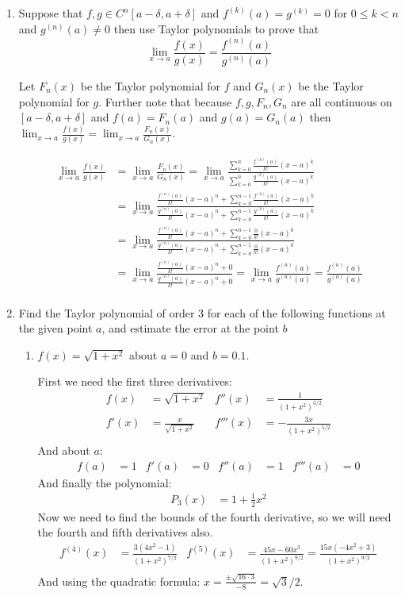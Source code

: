 \documentclass[letterpaper]{article}
\begin{document}
\begin{enumerate}
  \item
  Suppose that $f,g\in C^n[a-\delta,a+\delta]$ and $f^{(k)}(a)=g^{(k)}=0$ for $0\le k<n$ and $g^{(n)}(a)\ne 0$ then use Taylor polynomials to prove that
\[\lim_{x\to a}\frac{f(x)}{g(x)}=\frac{f^{(n)}(a)}{g^{(n)}(a)}\]

Let $F_n(x)$ be the Taylor polynomial for $f$ and $G_n(x)$ be the Taylor polynomial for $g$. Further note that because $f,g,F_n,G_n$ are all continuous on $[a-\delta,a+\delta]$ and $f(a)=F_n(a)$ and $g(a)=G_n(a)$ then $\lim_{x\to a}\frac{f(x)}{g(x)}=\lim_{x\to a}\frac{F_n(x)}{G_n(x)}$.

\begin{align*}
  \lim_{x\to a}\frac{f(x)}{g(x)}&=\lim_{x\to a}\frac{F_n(x)}{G_n(x)}
  =\lim_{x\to a}\frac{\sum\limits_{k=0}^n{\frac{f^{(k)}(a)}{k!}(x-a)^k}}{\sum\limits_{k=0}^n{\frac{g^{(k)}(a)}{k!}(x-a)^k}}\\
  &=\lim_{x\to a}\frac{\frac{f^{(n)}(a)}{k!}(x-a)^n+\sum\limits_{k=0}^{n-1}{\frac{f^{(k)}(a)}{k!}(x-a)^k}}{\frac{g^{(n)}(a)}{k!}(x-a)^n+\sum\limits_{k=0}^{n-1}{\frac{g^{(k)}(a)}{k!}(x-a)^k}}\\
  &=\lim_{x\to a}\frac{\frac{f^{(n)}(a)}{k!}(x-a)^n+\sum\limits_{k=0}^{n-1}{\frac{0}{k!}(x-a)^k}}{\frac{g^{(n)}(a)}{k!}(x-a)^n+\sum\limits_{k=0}^{n-1}{\frac{0}{k!}(x-a)^k}}\\
  &=\lim_{x\to a}\frac{\frac{f^{(n)}(a)}{k!}(x-a)^n+0}{\frac{g^{(n)}(a)}{k!}(x-a)^n+0}
  =\lim_{x\to a}\frac{f^{(n)}(a)}{g^{(n)}(a)}=\frac{f^{(n)}(a)}{g^{(n)}(a)}\\
\end{align*}
\item
Find the Taylor polynomial of order 3 for each of the following functions at the given point $a$, and estimate the error at the point $b$
  \begin{enumerate}
  \item
  $f(x)=\sqrt{1+x^2}$ about $a=0$ and $b=0.1$.

  First we need the first three derivatives:
  \begin{align*}
    f(x)&=\sqrt{1+x^2}&f''(x)&=\frac{1}{(1+x^2)^{3/2}}\\
    f'(x)&=\frac{x}{\sqrt{1+x^2}}&f'''(x)&=-\frac{3x}{(1+x^2)^{5/2}}\\
  \end{align*}
  And about $a$:
  \begin{align*}
    f(a)&=1&f'(a)&=0&f''(a)&=1&f'''(a)&=0
  \end{align*}
  And finally the polynomial:
  \begin{align*}
    P_3(x)&=1+\frac{1}{2}x^2
  \end{align*}
  Now we need to find the bounds of the fourth derivative, so we will need the fourth and fifth derivatives also.
  \begin{align*}
    f^{(4)}(x)&=\frac{3(4x^2-1)}{(1+x^2)^{7/2}}
    &f^{(5)}(x)&=\frac{45x-60x^3}{(1+x^2)^{9/2}}=\frac{15x(-4x^2+3)}{(1+x^2)^{9/2}}\\
  \end{align*}
    And using the quadratic formula: $x=\frac{\pm\sqrt{16\cdot3}}{-8}=\sqrt{3}/2$.


\end{enumerate}
\end{enumerate}
\end{document}
